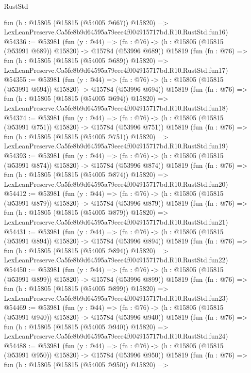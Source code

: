 \begin{lexlean}{RustStd}
\begin{coremodule}
    fun (h : @15805 (@15815 (@54005 @667)) @15820) =>
    LexLeanPreserve.Ca5fe8b9d64595a79eee4f004915717bd.R10.RustStd.fun16)
@54336 := @53981
    (fun (y : @44) =>
    (fn : @76) -> (h : @15805 (@15815 (@53991 @689)) @15820) -> @15784 (@53996 @689))
    @15819
    (fun (fn : @76) =>
    fun (h : @15805 (@15815 (@54005 @689)) @15820) =>
    LexLeanPreserve.Ca5fe8b9d64595a79eee4f004915717bd.R10.RustStd.fun17)
@54355 := @53981
    (fun (y : @44) =>
    (fn : @76) -> (h : @15805 (@15815 (@53991 @694)) @15820) -> @15784 (@53996 @694))
    @15819
    (fun (fn : @76) =>
    fun (h : @15805 (@15815 (@54005 @694)) @15820) =>
    LexLeanPreserve.Ca5fe8b9d64595a79eee4f004915717bd.R10.RustStd.fun18)
@54374 := @53981
    (fun (y : @44) =>
    (fn : @76) -> (h : @15805 (@15815 (@53991 @751)) @15820) -> @15784 (@53996 @751))
    @15819
    (fun (fn : @76) =>
    fun (h : @15805 (@15815 (@54005 @751)) @15820) =>
    LexLeanPreserve.Ca5fe8b9d64595a79eee4f004915717bd.R10.RustStd.fun19)
@54393 := @53981
    (fun (y : @44) =>
    (fn : @76) -> (h : @15805 (@15815 (@53991 @874)) @15820) -> @15784 (@53996 @874))
    @15819
    (fun (fn : @76) =>
    fun (h : @15805 (@15815 (@54005 @874)) @15820) =>
    LexLeanPreserve.Ca5fe8b9d64595a79eee4f004915717bd.R10.RustStd.fun20)
@54412 := @53981
    (fun (y : @44) =>
    (fn : @76) -> (h : @15805 (@15815 (@53991 @879)) @15820) -> @15784 (@53996 @879))
    @15819
    (fun (fn : @76) =>
    fun (h : @15805 (@15815 (@54005 @879)) @15820) =>
    LexLeanPreserve.Ca5fe8b9d64595a79eee4f004915717bd.R10.RustStd.fun21)
@54431 := @53981
    (fun (y : @44) =>
    (fn : @76) -> (h : @15805 (@15815 (@53991 @894)) @15820) -> @15784 (@53996 @894))
    @15819
    (fun (fn : @76) =>
    fun (h : @15805 (@15815 (@54005 @894)) @15820) =>
    LexLeanPreserve.Ca5fe8b9d64595a79eee4f004915717bd.R10.RustStd.fun22)
@54450 := @53981
    (fun (y : @44) =>
    (fn : @76) -> (h : @15805 (@15815 (@53991 @899)) @15820) -> @15784 (@53996 @899))
    @15819
    (fun (fn : @76) =>
    fun (h : @15805 (@15815 (@54005 @899)) @15820) =>
    LexLeanPreserve.Ca5fe8b9d64595a79eee4f004915717bd.R10.RustStd.fun23)
@54469 := @53981
    (fun (y : @44) =>
    (fn : @76) -> (h : @15805 (@15815 (@53991 @940)) @15820) -> @15784 (@53996 @940))
    @15819
    (fun (fn : @76) =>
    fun (h : @15805 (@15815 (@54005 @940)) @15820) =>
    LexLeanPreserve.Ca5fe8b9d64595a79eee4f004915717bd.R10.RustStd.fun24)
@54488 := @53981
    (fun (y : @44) =>
    (fn : @76) -> (h : @15805 (@15815 (@53991 @950)) @15820) -> @15784 (@53996 @950))
    @15819
    (fun (fn : @76) =>
    fun (h : @15805 (@15815 (@54005 @950)) @15820) =>

\end{coremodule}
\end{lexlean}
